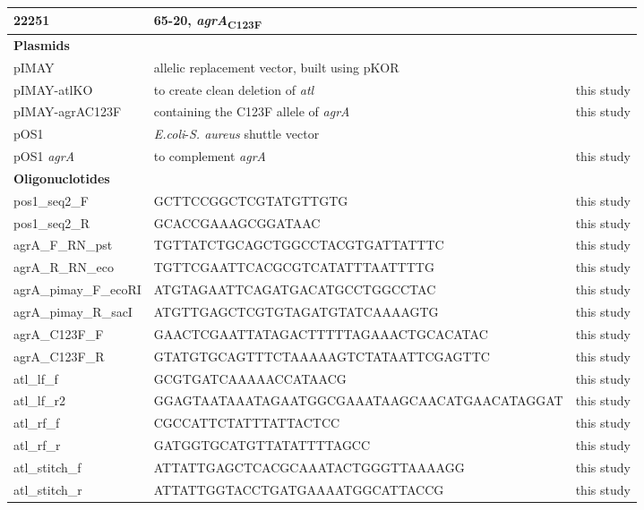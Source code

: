 \documentclass[10pt,letterpaper]{article}
\begin{document}
\begin{table}[!ht]
\begin{adjustwidth}{-2.25in}{0in}
\begin{tabular}{|l|l|l|}
22251 & 65-20, \textit{agrA}\textsubscript{C123F} & \cite{deleo_molecular_2011}\\ \hline
\multicolumn{3}{|l|}{\bf Plasmids}\\ \hline
pIMAY & allelic replacement vector, built using pKOR & \cite{monk_transforming_2012}\\ \hline
pIMAY-atlKO & to create clean deletion of \textit{atl} & this study\\ \hline
pIMAY-agrAC123F & containing the C123F allele of \textit{agrA} & this study\\ \hline
pOS1 & \textit{E.coli}-\textit{S. aureus} shuttle vector & \cite{schneewind_cell_1993}\\ \hline
pOS1 \textit{agrA} & to complement \textit{agrA} & this study\\ \hline
\multicolumn{3}{|l|}{\bf Oligonuclotides}\\ \hline
pos1\_seq2\_F & GCTTCCGGCTCGTATGTTGTG & this study\\ \hline
pos1\_seq2\_R & GCACCGAAAGCGGATAAC & this study\\ \hline
agrA\_F\_RN\_pst & TGTTATCTGCAGCTGGCCTACGTGATTATTTC & this study\\ \hline
agrA\_R\_RN\_eco & TGTTCGAATTCACGCGTCATATTTAATTTTG & this study\\ \hline
agrA\_pimay\_F\_ecoRI & ATGTAGAATTCAGATGACATGCCTGGCCTAC & this study\\ \hline
agrA\_pimay\_R\_sacI & ATGTTGAGCTCGTGTAGATGTATCAAAAGTG & this study\\ \hline
agrA\_C123F\_F & GAACTCGAATTATAGACTTTTTAGAAACTGCACATAC & this study\\ \hline
agrA\_C123F\_R & GTATGTGCAGTTTCTAAAAAGTCTATAATTCGAGTTC & this study\\ \hline
atl\_lf\_f & GCGTGATCAAAAACCATAACG & this study\\ \hline
atl\_lf\_r2 & GGAGTAATAAATAGAATGGCGAAATAAGCAACATGAACATAGGAT & this study\\ \hline
atl\_rf\_f & CGCCATTCTATTTATTACTCC & this study\\ \hline
atl\_rf\_r & GATGGTGCATGTTATATTTTAGCC & this study\\ \hline
atl\_stitch\_f & ATTATTGAGCTCACGCAAATACTGGGTTAAAAGG & this study\\ \hline
atl\_stitch\_r & ATTATTGGTACCTGATGAAAATGGCATTACCG & this study\\ \hline
\end{tabular}
\label{table1}
\end{adjustwidth}
\end{table}
\end{document}

